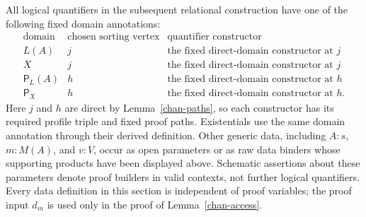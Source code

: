 All logical quantifiers in the subsequent relational construction have
one of the following fixed domain annotations:
\[
\begin{array}{c|c|c}
\text{domain}&\text{chosen sorting vertex}&\text{quantifier constructor}\\ \hline
L(A)&j&\text{the fixed direct-domain constructor at }j\\
X&j&\text{the fixed direct-domain constructor at }j\\
\mathsf P_L(A)&h&\text{the fixed direct-domain constructor at }h\\
\mathsf P_X&h&\text{the fixed direct-domain constructor at }h.
\end{array}
\]
Here $j$ and $h$ are direct by Lemma~\ref{chan-paths}, so each constructor
has its required profile triple and fixed proof paths.  Existentials use
the same domain annotation through their derived definition.  Other
generic data, including $A:s$, $m:M(A)$, and $v:V$, occur as open
parameters or as raw data binders whose supporting products have been
displayed above.  Schematic assertions about these parameters denote
proof builders in valid contexts, not further logical quantifiers.
Every data definition in this section is independent of proof variables;
the proof input $d_m$ is used only in the proof of
Lemma~\ref{chan-access}.
